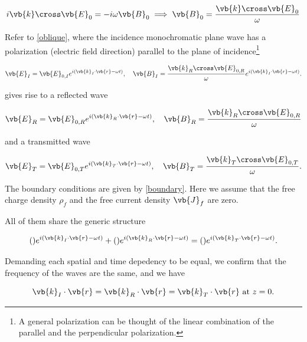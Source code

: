 \documentclass[english,a4paper,12pt]{report}
\begin{document}
\begin{equation}
    i \vb{k} \cross \vb{E} _{0} = - i\omega \vb{B} _{0} \implies   \vb{B} _{0} = \frac{\vb{k} \cross \vb{E} _{0} }{\omega }  
\end{equation}

Refer to \cref{oblique}, where the incidence monochromatic plane wave has a polarization (electric field direction) parallel to the plane of incidence\footnote{A general polarization can be thought of the linear combination of the parallel and the perpendicular polarization.} 


\begin{equation}
    \vb{E} _{I}  = \vb{E} _{0,I} e^{i(\vb{k} _{I}\cdot \vb{r} -\omega t )}, \quad \vb{B} _{I} = \frac{\vb{k}_{R}  \cross \vb{E} _{0,R} }{\omega } e^{i(\vb{k} _{I}\cdot \vb{r} -\omega t )}.     
\end{equation}

gives rise to a reflected wave 

\begin{equation}
    \vb{E} _{R} = \vb{E} _{0,R} e^{i(\vb{k} _{R} \cdot \vb{r} - \omega t )}, \quad \vb{B} _{R} = \frac{\vb{k} _{R} \cross \vb{E} _{0,R}  }{\omega }   
\end{equation}

and a transmitted wave

\begin{equation}
    \vb{E} _{T} = \vb{E} _{0,T} e^{i(\vb{k} _{T} \cdot \vb{r} -\omega t )}, \quad \vb{B} _{T} = \frac{\vb{k} _{T} \cross \vb{E} _{0,T}  }{\omega }.   
\end{equation}

The boundary conditions are given by \cref{boundary}. Here we assume that the free charge density \(\rho _{f} \) and the free current density \(\vb{J} _{f} \) are zero.   

All of them share the generic structure 

\begin{equation}
    ()e^{i(\vb{k} _{I}\cdot \vb{r} -\omega t )} + ()e^{i(\vb{k} _{R}\cdot \vb{r} - \omega t)} = () e^{i(\vb{k} _{T} \cdot \vb{r} -\omega t )}.
\end{equation}

Demanding each spatial and time depedency to be equal, we confirm that the frequency of the waves are the same, and we have

\begin{equation}
    \vb{k} _{I} \cdot \vb{r} = \vb{k} _{R} \cdot \vb{r} = \vb{k} _{T} \cdot \vb{r} \text{ at } z=0.   
\end{equation}
\end{document}

